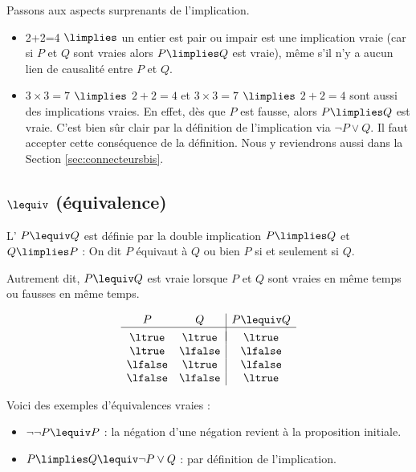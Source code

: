 \documentclass[11pt,class=report,crop=false]{standalone}
\begin{document}
Passons aux aspects surprenants de l'implication.
\begin{itemize}	
	\item \og{}2+2=4\fg{} $\limplies$ \og{}un entier est pair ou impair\fg{} est une implication vraie (car si $P$ et $Q$ sont vraies alors $P \limplies Q$ est vraie), même s'il n'y a aucun lien de causalité entre $P$ et $Q$.
	
	\item \og{}$3 \times 3 = 7$\fg{} $\limplies$ \og{}$2+2=4$\fg{} 
	et \og{}$3 \times 3 = 7$\fg{} $\limplies$ \og{}$2+2=4$\fg{}
	sont aussi des implications vraies.
	En effet, dès que $P$ est fausse, alors $P \limplies Q$ est vraie. C'est bien sûr clair par la définition de l'implication via $\lnot P \lor Q$. Il faut accepter cette conséquence de la définition. Nous y reviendrons aussi dans la Section \ref{sec:connecteursbis}.
\end{itemize}


\subsection{$\lequiv$ (équivalence)}

L' $P \lequiv Q$ est définie par la double implication $P \limplies Q$ et $Q \limplies P$ :
On dit \og{}$P$ équivaut à $Q$\fg{} ou bien \og{}$P$ si et seulement si $Q$\fg{}.

Autrement dit, $P \lequiv Q$ est vraie lorsque $P$ et $Q$ sont vraies en même temps ou fausses en même temps.

\[
\begin{array}{c c | c}
	P		& Q 		& P \lequiv Q \\
	\hline
	&&	\\[-2ex]
	\ltrue 	& \ltrue 	& \ltrue \\
	\ltrue 	& \lfalse 	& \lfalse \\
	\lfalse & \ltrue 	& \lfalse \\	
	\lfalse & \lfalse 	& \ltrue \\		
\end{array}
\]

Voici des exemples d'équivalences vraies :
\begin{itemize}
	\item $\lnot \lnot P \lequiv P$ : la négation d'une négation revient à la proposition initiale.
	
	\item $P \limplies Q \lequiv \lnot P \lor Q$ : par définition de l'implication.
\end{itemize}
\end{document}
